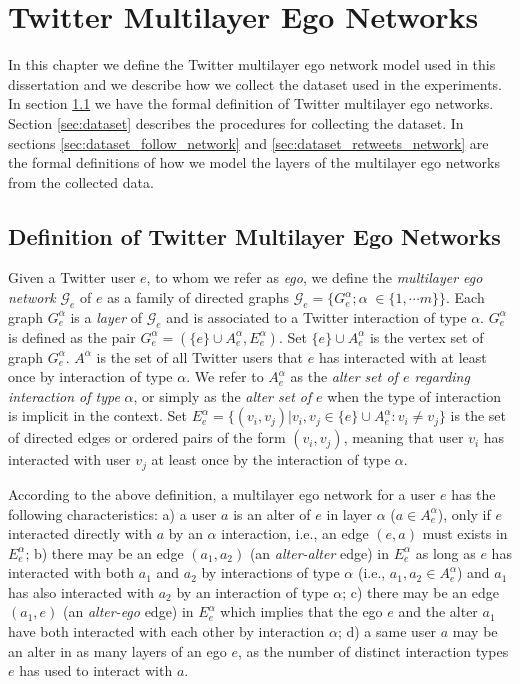 \chapter{Twitter Multilayer Ego Networks}
\label{cap:ExpSetup}

In this chapter we define the Twitter multilayer ego network model used in this dissertation and we describe how we collect the dataset used in the experiments. In section \ref{sec:MEN} we have the formal definition of Twitter multilayer ego networks. Section \ref{sec:dataset} describes the procedures for collecting the dataset. In sections \ref{sec:dataset_follow_network} and \ref{sec:dataset_retweets_network} are the formal definitions of how we model the layers of the multilayer ego networks from the collected data.



\section{Definition of Twitter Multilayer Ego Networks}
\label{sec:MEN}
Given a Twitter user $e$, to whom we refer  as {\em ego}, we define the {\em multilayer ego network} $\mathcal{G}_e$ of $e$ 
as a  family of directed graphs  $\mathcal{G}_e=\{G_e^{\alpha};  \alpha \; \in\{1, \cdots m\} \}$. Each  graph  $G_e^{\alpha}$ is  a {\em layer} of $\mathcal{G}_e$ and is associated to a  Twitter interaction  of type $\alpha$.  $G_e^{\alpha}$ is defined as the pair $G_e^\alpha = (\{e\} \cup A_e^{\alpha}, E_e^{\alpha})$.  
Set $\{e\} \cup A^\alpha_e$ is the vertex set of graph $G_e^\alpha$.  $A^{\alpha}$ is the set of  all Twitter users that $e$ has interacted with at least once by interaction of  type $\alpha$. We refer to $A_e^{\alpha}$ as the  {\em alter set of $e$ regarding interaction of type} $\alpha$, or simply as the {\em alter set of} $e$ when the type of interaction is implicit in the context. Set $E_e^{\alpha} =  \{(v_i,v_j) | v_i,v_j \in \{e\} \cup A_e^\alpha: v_i \neq v_j\}$ is the set of directed edges or ordered pairs of the form $(v_i,v_j)$, meaning that user $v_i$ has interacted with user $v_j$ at least once by the interaction of type $\alpha$. 


According to the above definition, a multilayer ego network for a user $e$ has the following characteristics: a) a user $a$ is an alter of $e$ in layer $\alpha$ ($a \in A^{\alpha}_e$), only if $e$ interacted directly with $a$ by an $\alpha$ interaction, i.e., an edge $(e,a)$
must exists in $E_e^{\alpha}$; b) there may  be an edge  $(a_1,a_2)$ (an {\em alter-alter} edge) in $E_e^{\alpha}$ as long as $e$ has interacted with both $a_1$ and $a_2$ by interactions of type $\alpha$ (i.e., $a_1,a_2 \in A_e^{\alpha}$) and $a_1$  has also interacted with  $a_2$ by an interaction of type $\alpha$; c) there may be an edge $(a_1,e)$ (an {\em alter-ego} edge) in $E_e^{\alpha}$ which implies that the  ego $e$ and the alter $a_1$ have both interacted with each other by interaction $\alpha$; d) a same user $a$ may be an alter in as many layers of an ego $e$, as the number of distinct interaction types $e$ has used to interact with $a$. 
 
